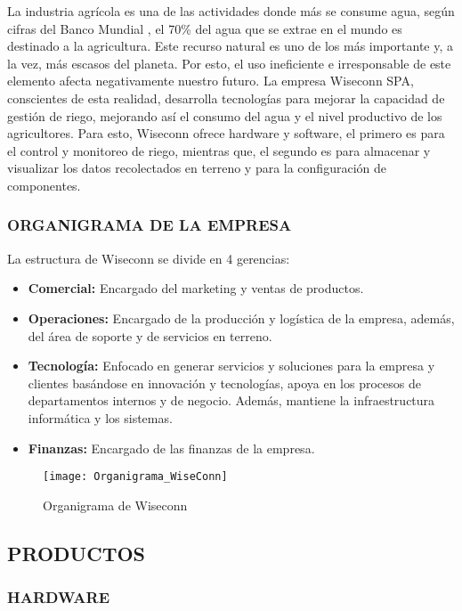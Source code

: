 La industria agrícola es una de las actividades donde más se consume agua, según cifras del Banco Mundial \cite{bancomundialagua}, el 70\% del agua que se extrae en el mundo es destinado a la agricultura. Este recurso natural es uno de los más importante y, a la vez, más escasos del planeta. Por esto, el uso ineficiente e irresponsable de este elemento afecta negativamente nuestro futuro.
La empresa Wiseconn SPA, conscientes de esta realidad, desarrolla tecnologías para mejorar la capacidad de gestión de riego, mejorando así el consumo del agua y el nivel productivo de los agricultores. Para esto, Wiseconn ofrece hardware y software, el primero es para el control y monitoreo de riego, mientras que, el segundo es para almacenar y visualizar los datos recolectados en terreno y para la configuración de componentes.

\subsubsection{ORGANIGRAMA DE LA EMPRESA}

La estructura de Wiseconn se divide en 4 gerencias:
\begin{itemize}
	\item \textbf{Comercial:} Encargado del marketing y ventas de productos.
	\item \textbf{Operaciones:} Encargado de la producción y logística de la empresa, además, del área de soporte y de servicios en terreno.
	\item \textbf{Tecnología:} Enfocado en generar servicios y soluciones para la empresa y clientes basándose en innovación y tecnologías, apoya en los procesos de departamentos internos y de negocio. Además, mantiene la infraestructura informática y los sistemas.
	\item \textbf{Finanzas:} Encargado de las finanzas de la empresa.
\end{itemize}

\begin{figure}[h]
	\centering
	\texttt{[image: Organigrama\_WiseConn]}
	\caption{\label{fig:orgwis} Organigrama de Wiseconn}
\end{figure}

\subsection{PRODUCTOS}
\subsubsection{HARDWARE}

